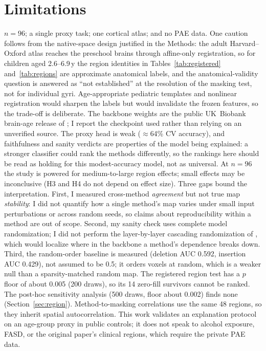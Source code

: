 \documentclass[11pt]{article}
\begin{document}
\section{Limitations}
\label{sec:limits}
$n=96$; a single proxy task; one cortical atlas; and no PAE data. One caution follows from the
native-space design justified in the Methods: the adult Harvard--Oxford atlas reaches the
preschool brains through affine-only registration, so for children aged 2.6--6.9\,y the region
identities in Tables~\ref{tab:registered} and~\ref{tab:regions} are approximate anatomical labels, and the
anatomical-validity question is answered as ``not established'' at the resolution of the masking
test, not for individual gyri. Age-appropriate pediatric templates and nonlinear registration would sharpen the labels
\citep{fonov2011} but would invalidate the frozen features, so the trade-off is deliberate. The backbone weights are the
public UK~Biobank brain-age release of \citet{peng2021} \citep{sfcnweights}; I report the
checkpoint used rather than relying on an unverified source. The proxy head is weak
($\approx$64\% CV accuracy), and faithfulness and sanity verdicts are properties of the
model being explained: a stronger classifier could rank the methods differently, so the
rankings here should be read as holding for this modest-accuracy model, not as universal. At
$n=96$ the study is powered for medium-to-large region
effects; small effects may be inconclusive (H3 and H4 do not depend on effect size). Three
gaps bound the interpretation. First, I measured cross-method \emph{agreement} but
not true map \emph{stability}: I did not quantify how a single method's map varies under small
input perturbations or across random seeds, so claims about reproducibility within a method are
out of scope. Second, my sanity check uses complete model randomization; I did not perform the
layer-by-layer cascading randomization of \citet{adebayo2018}, which would localize where in the
backbone a method's dependence breaks down. Third, the random-order baseline is measured (deletion AUC 0.592, insertion AUC 0.429), not assumed
to be 0.5; it orders voxels at random, which is a weaker null than a sparsity-matched random map. The registered region test has a $p$ floor of about 0.005 (200 draws), so its 14 zero-fill survivors cannot be ranked. The post-hoc sensitivity analysis (500 draws, floor about 0.002) finds none (Section~\ref{sec:region}). Method-to-masking correlations use the same 48 regions, so they inherit
spatial autocorrelation. This work validates an explanation
protocol on an age-group proxy in public controls; it does not speak to alcohol exposure,
FASD, or the original paper's clinical regions, which require the private PAE data.
\end{document}
